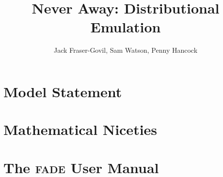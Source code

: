 \documentclass[10pt]{article}
\title{Never \fade{} Away: Distributional Emulation}
\author{Jack Fraser-Govil, Sam Watson, Penny Hancock}
\def\fade{\textmd{\textsc{fade}}}
\begin{document}
	\maketitle{}

	\tableofcontents{}
	\clearpage
	\section{Model Statement}
		
		
		
		\clearpage

	\section{Mathematical Niceties}
		

		\clearpage
	\section{The \fade{} User Manual}
		
\end{document}
